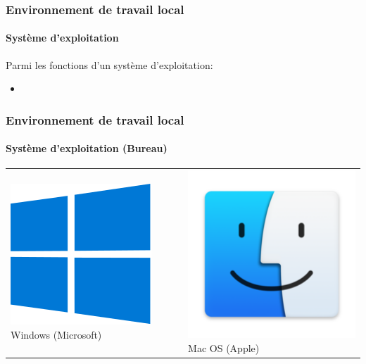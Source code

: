 \documentclass{beamer}
\begin{document}
\begin{frame}
\frametitle{Environnement de travail local}
\framesubtitle{Système d'exploitation}

Parmi les fonctions d'un système d'exploitation: 
\begin{itemize}
	\item 
\end{itemize}

\end{frame}

\begin{frame}
\frametitle{Environnement de travail local}
\framesubtitle{Système d'exploitation (Bureau)}

\begin{tabular}{ll}
	\includegraphics[height=.25\textheight]{..//img/Bweb01-environnement/windows.png} 
	Windows (Microsoft) &
	\includegraphics[height=.25\textheight]{..//img/Bweb01-environnement/mac-finder.png} 
	Mac OS (Apple) \\
	

\end{tabular}
\end{frame}
\end{document}

